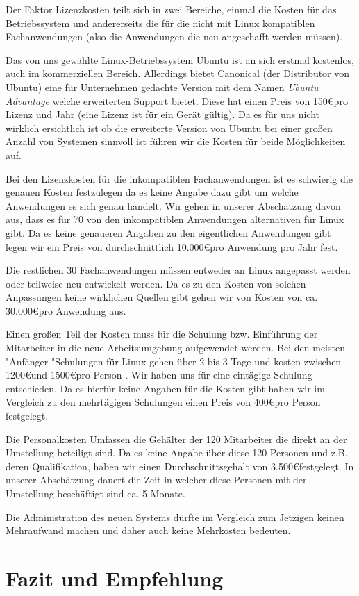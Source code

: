 \documentclass[12pt,utf8]{scrartcl}
\begin{document}
Der Faktor Lizenzkosten teilt sich in zwei Bereiche, einmal die Kosten für das Betriebssystem und andererseits die für die nicht mit Linux kompatiblen Fachanwendungen (also die Anwendungen die neu angeschafft werden müssen).

Das von uns gewählte Linux-Betriebssystem Ubuntu ist an sich erstmal kostenlos, auch im kommerziellen Bereich. Allerdings bietet Canonical (der Distributor von Ubuntu) eine für Unternehmen gedachte Version mit dem Namen \emph{Ubuntu Advantage} welche erweiterten Support bietet. Diese hat einen Preis von 150\euro \space pro Lizenz und Jahr (eine Lizenz ist für ein Gerät gültig). Da es für uns nicht wirklich ersichtlich ist ob die erweiterte Version von Ubuntu bei einer großen Anzahl von Systemen sinnvoll ist führen wir die Kosten für beide Möglichkeiten auf.

Bei den Lizenzkosten für die inkompatiblen Fachanwendungen ist es schwierig die genauen Kosten festzulegen da es keine Angabe dazu gibt um welche Anwendungen es sich genau handelt. Wir gehen in unserer Abschätzung davon aus, dass es für 70 von den inkompatiblen Anwendungen alternativen für Linux gibt. Da es keine genaueren Angaben zu den eigentlichen Anwendungen gibt legen wir ein Preis von durchschnittlich 10.000\euro \space pro Anwendung pro Jahr fest.

Die restlichen 30 Fachanwendungen müssen entweder an Linux angepasst werden oder teilweise neu entwickelt werden. Da es zu den Kosten von solchen Anpassungen keine wirklichen Quellen gibt gehen wir von Kosten von ca. 30.000\euro pro Anwendung aus.

Einen großen Teil der Kosten muss für die Schulung bzw. Einführung der Mitarbeiter in die neue Arbeitsumgebung aufgewendet werden. Bei den meisten "Anfänger-"Schulungen für Linux gehen über 2 bis 3 Tage und kosten zwischen 1200\euro \space und 1500\euro \space pro Person . Wir haben uns für eine eintägige Schulung entschieden. Da es hierfür keine Angaben für die Kosten gibt haben wir im Vergleich zu den mehrtägigen Schulungen einen Preis von 400\euro \space pro Person festgelegt.

Die Personalkosten Umfassen die Gehälter der 120 Mitarbeiter die direkt an der Umstellung beteiligt sind. Da es keine Angabe über diese 120 Personen und z.B. deren Qualifikation, haben wir einen Durchschnittsgehalt von 3.500\euro \space festgelegt. In unserer Abschätzung dauert die Zeit in welcher diese Personen mit der Umstellung beschäftigt sind ca. 5 Monate.

Die Administration des neuen Systems dürfte im Vergleich zum Jetzigen keinen Mehraufwand machen und daher auch keine Mehrkosten bedeuten.



\newpage
\section*{Fazit und Empfehlung}

\newpage
{}

\end{document}
